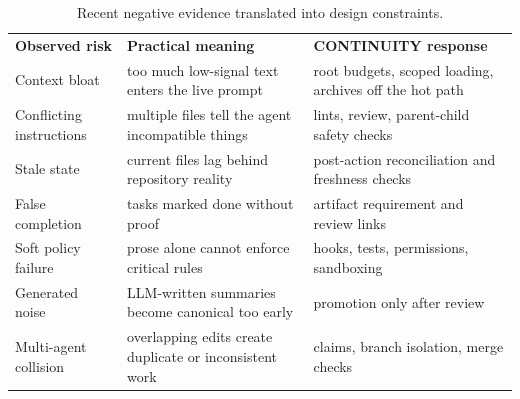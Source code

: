 
\begin{table}[H]
\centering
\caption{Recent negative evidence translated into design constraints.}
\label{tab:negative-constraints}
\footnotesize
{}
\begin{tabularx}{\linewidth}{>{\raggedright\arraybackslash}p{2.15cm}>{\raggedright\arraybackslash}p{4.35cm}X}
\rowcolor{BitNavy!8}
\textbf{Observed risk} & \textbf{Practical meaning} & \textbf{CONTINUITY response} \\
Context bloat & too much low-signal text enters the live prompt & root budgets, scoped loading, archives off the hot path \\
Conflicting instructions & multiple files tell the agent incompatible things & lints, review, parent-child safety checks \\
Stale state & current files lag behind repository reality & post-action reconciliation and freshness checks \\
False completion & tasks marked done without proof & artifact requirement and review links \\
Soft policy failure & prose alone cannot enforce critical rules & hooks, tests, permissions, sandboxing \\
Generated noise & LLM-written summaries become canonical too early & promotion only after review \\
Multi-agent collision & overlapping edits create duplicate or inconsistent work & claims, branch isolation, merge checks \\
\end{tabularx}
\end{table}
